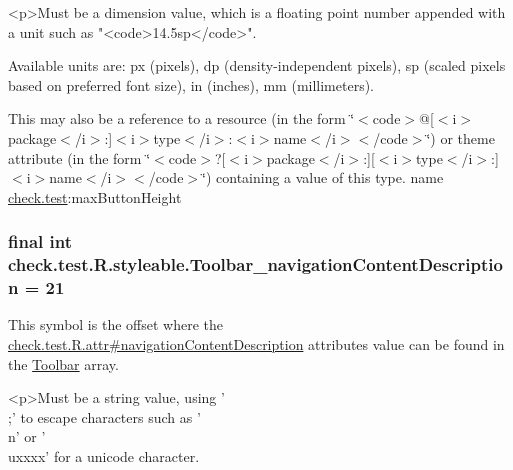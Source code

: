 \begin{DoxyVerb}      <p>Must be a dimension value, which is a floating point number appended with a unit such as "<code>14.5sp</code>".
\end{DoxyVerb}
 Available units are\+: px (pixels), dp (density-\/independent pixels), sp (scaled pixels based on preferred font size), in (inches), mm (millimeters). 

This may also be a reference to a resource (in the form \char`\"{}$<$code$>$@\mbox{[}$<$i$>$package$<$/i$>$\+:\mbox{]}$<$i$>$type$<$/i$>$\+:$<$i$>$name$<$/i$>$$<$/code$>$\char`\"{}) or theme attribute (in the form \char`\"{}$<$code$>$?\mbox{[}$<$i$>$package$<$/i$>$\+:\mbox{]}\mbox{[}$<$i$>$type$<$/i$>$\+:\mbox{]}$<$i$>$name$<$/i$>$$<$/code$>$\char`\"{}) containing a value of this type.  name \hyperlink{namespacecheck_1_1test}{check.\+test}\+:max\+Button\+Height \hypertarget{classcheck_1_1test_1_1_r_1_1styleable_ad99d197ecf766148183b75964c1fcb43}{}
\subsubsection[{Toolbar\+\_\+navigation\+Content\+Description}]{\setlength{\rightskip}{0pt plus 5cm}final int check.\+test.\+R.\+styleable.\+Toolbar\+\_\+navigation\+Content\+Description = 21\hspace{0.3cm}{\ttfamily [static]}}\label{classcheck_1_1test_1_1_r_1_1styleable_ad99d197ecf766148183b75964c1fcb43}
This symbol is the offset where the \hyperlink{classcheck_1_1test_1_1_r_1_1attr_a9bbeac1a500649466bdd64ac1ef20ca8}{check.\+test.\+R.\+attr\#navigation\+Content\+Description} attribute\textquotesingle{}s value can be found in the \hyperlink{classcheck_1_1test_1_1_r_1_1styleable_a1a7fa90223693abef77e7484cca2df54}{Toolbar} array.

\begin{DoxyVerb}      <p>Must be a string value, using '\\;' to escape characters such as '\\n' or '\\uxxxx' for a unicode character.
\end{DoxyVerb}
 

